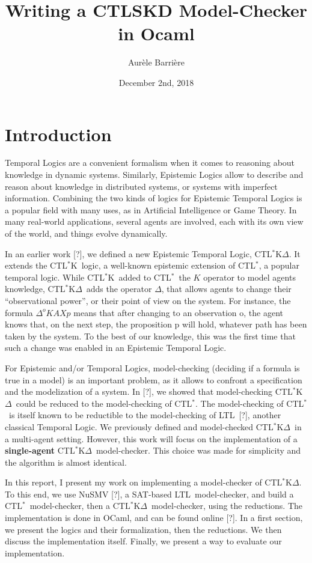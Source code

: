 \documentclass[dvipsnames]{acmart}
\title{Writing a CTLSKD Model-Checker in Ocaml}
\author{Aur\`ele Barri\`ere}
\date{December 2nd, 2018}
\def\ctls{CTL$^{*}$}
\def\ctlsk{CTL$^{*}$K}
\def\ctlskd{CTL$^{*}$K$\Delta$}
\def\ltl{LTL}
\def\A{\mathit{A}}
\def\X{\mathit{X}}
\def\K{\mathit{K}}
\def\D#1{\Delta^{#1}}
\begin{document}
\maketitle

\section{Introduction}

Temporal Logics are a convenient formalism when it comes to reasoning about knowledge in dynamic systems.
Similarly, Epistemic Logics allow to describe and reason about knowledge in distributed systems, or systems with imperfect information.
Combining the two kinds of logics for Epistemic Temporal Logics is a popular field with many uses, as in Artificial Intelligence or Game Theory.
In many real-world applications, several agents are involved, each with its own view of the world, and things evolve dynamically.

In an earlier work [?], we defined a new Epistemic Temporal Logic, \ctlskd.
It extends the \ctlsk\ logic, a well-known epistemic extension of \ctls, a popular temporal logic.
While \ctlsk\ added to \ctls\ the $\K$ operator to model agents knowledge, \ctlskd\ adds the operator $\Delta$, that allows agents to change their ``observational power'', or their point of view on the system.
For instance, the formula $\D{o}\K\A\X p$ means that after changing to an observation o, the agent knows that, on the next step, the proposition p will hold, whatever path has been taken by the system.
To the best of our knowledge, this was the first time that such a change was enabled in an Epistemic Temporal Logic.

For Epistemic and/or Temporal Logics, model-checking (deciding if a formula is true in a model) is an important problem, as it allows to confront a specification and the modelization of a system.
In [?], we showed that model-checking \ctlskd\ could be reduced to the model-checking of \ctls. The model-checking of \ctls\ is itself known to be reductible to the model-checking of \ltl\ [?], another classical Temporal Logic.
We previously defined and model-checked \ctlskd\ in a multi-agent setting. However, this work will focus on the implementation of a \textbf{single-agent} \ctlskd\ model-checker. This choice was made for simplicity and the algorithm is almost identical.

In this report, I present my work on implementing a model-checker of \ctlskd. To this end, we use NuSMV [?], a SAT-based \ltl\ model-checker, and build a \ctls\ model-checker, then a  \ctlskd\ model-checker, using the reductions.
The implementation is done in OCaml, and can be found online [?]. In a first section, we present the logics and their formalization, then the reductions. We then discuss the implementation itself. Finally, we present a way to evaluate our implementation.
\end{document}
